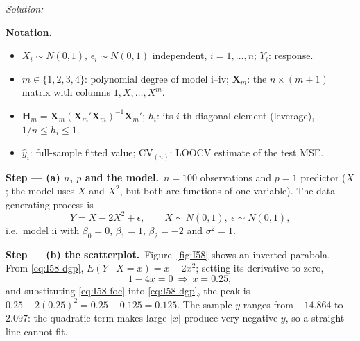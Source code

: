 \documentclass[11pt,a4paper]{article}
\newif\ifsolucoes
\newcommand{\espacoresol}{3.5cm}   %
\numberwithin{equation}{questao}   %
\newenvironment{notacao}{\par\smallskip\noindent\textbf{Notation.}\begin{itemize}[leftmargin=1.4em,topsep=1pt,itemsep=0pt]\small}{\end{itemize}}
\newcommand{\resolespaco}{\ifsolucoes\else\par\textit{Solution:}\vspace{\espacoresol}\par\fi}
\newcommand{\passo}[2]{\par\smallskip\noindent\textbf{Step --- #1.}~#2}
\begin{document}
\resolespaco
\begin{sol}
\begin{notacao}
\item $X_i\sim N(0,1)$, $\epsilon_i\sim N(0,1)$ independent, $i=1,\dots,n$; $Y_i$: response.
\item $m\in\{1,2,3,4\}$: polynomial degree of model i--iv; $\mathbf X_m$: the $n\times(m+1)$ matrix with columns $1,X,\dots,X^m$.
\item $\mathbf H_m=\mathbf X_m(\mathbf X_m'\mathbf X_m)^{-1}\mathbf X_m'$; $h_i$: its $i$-th diagonal element (leverage), $1/n\le h_i\le1$.
\item $\hat y_i$: full-sample fitted value; $\mathrm{CV}_{(n)}$: LOOCV estimate of the test MSE.
\end{notacao}

\passo{(a) $n$, $p$ and the model}{$n=100$ observations and $p=1$ predictor ($X$; the model
uses $X$ and $X^2$, but both are functions of one variable). The data-generating process is
\begin{equation}\label{eq:I58-dgp}
Y=X-2X^2+\epsilon,\qquad X\sim N(0,1),\ \epsilon\sim N(0,1),
\end{equation}
i.e.\ model ii with $\beta_0=0$, $\beta_1=1$, $\beta_2=-2$ and $\sigma^2=1$.}

\passo{(b) the scatterplot}{Figure~\ref{fig:I58} shows an inverted parabola. From
\eqref{eq:I58-dgp}, $E(Y\mid X=x)=x-2x^2$; setting its derivative to zero,
\begin{equation}\label{eq:I58-foc}
1-4x=0\ \Rightarrow\ x=0.25,
\end{equation}
and substituting \eqref{eq:I58-foc} into \eqref{eq:I58-dgp}, the peak is
$0.25-2(0.25)^2=0.25-0.125=0.125$. The sample $y$ ranges from $-14.864$ to $2.097$: the
quadratic term makes large $|x|$ produce very negative $y$, so a straight line cannot fit.}


\end{sol}
\end{document}
